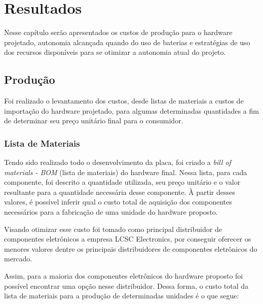 \chapter{Resultados}
\label{chap:resultados}

Nesse capítulo serão apresentados os custos de produção para o hardware projetado, autonomia alcançada quando do uso de baterias e estratégias de uso dos recursos disponíveis para se otimizar a autonomia atual do projeto.

\section{Produção}

Foi realizado o levantamento dos custos, desde listas de materiais a custos de importação do hardware projetado, para algumas determinadas quantidades a fim de determinar seu preço unitário final para o consumidor.

\subsection{Lista de Materiais}

Tendo sido realizado todo o desenvolvimento da placa, foi criado a \textit{bill of materials - BOM} (lista de materiais) do hardware final. Nessa lista, para cada componente, foi descrito a quantidade utilizada, seu preço unitário e o valor resultante para a quantidade necessária desse componente. À partir desses valores, é possível inferir qual o custo total de aquisição dos componentes necessários para a fabricação de uma unidade do hardware proposto. 

Visando otimizar esse custo foi tomado como principal distribuidor de componentes eletrônicos a empresa LCSC Electronics, por conseguir oferecer os menores valores dentre os principais distribuidores de componentes eletrônicos do mercado. 

Assim, para a maioria dos componentes eletrônicos do hardware proposto foi possível encontrar uma opção nesse distribuidor. Dessa forma, o custo total da lista de materiais para a produção de determinadas unidades é o que segue:

	\begin{table}[!h]
	\captionsetup{width=7cm}%
    \end{table}





